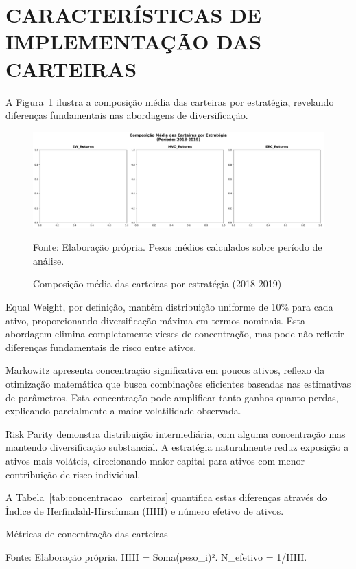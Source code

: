 \section{CARACTERÍSTICAS DE IMPLEMENTAÇÃO DAS CARTEIRAS}

A Figura~\ref{fig:composicao_carteiras} ilustra a composição média das carteiras por estratégia, revelando diferenças fundamentais nas abordagens de diversificação.

\begin{figure}[H]
\centering
\includegraphics[width=\textwidth]{figures/composicao_carteiras_essencial.png}
\caption{Composição média das carteiras por estratégia (2018-2019)}
\label{fig:composicao_carteiras}
\footnotesize
Fonte: Elaboração própria. Pesos médios calculados sobre período de análise.
\end{figure}

Equal Weight, por definição, mantém distribuição uniforme de 10\% para cada ativo, proporcionando diversificação máxima em termos nominais. Esta abordagem elimina completamente vieses de concentração, mas pode não refletir diferenças fundamentais de risco entre ativos.

Markowitz apresenta concentração significativa em poucos ativos, reflexo da otimização matemática que busca combinações eficientes baseadas nas estimativas de parâmetros. Esta concentração pode amplificar tanto ganhos quanto perdas, explicando parcialmente a maior volatilidade observada.

Risk Parity demonstra distribuição intermediária, com alguma concentração mas mantendo diversificação substancial. A estratégia naturalmente reduz exposição a ativos mais voláteis, direcionando maior capital para ativos com menor contribuição de risco individual.

A Tabela~\ref{tab:concentracao_carteiras} quantifica estas diferenças através do Índice de Herfindahl-Hirschman (HHI) e número efetivo de ativos.

\begin{table}[H]
\centering
\caption{Métricas de concentração das carteiras}
\label{tab:concentracao_carteiras}

\footnotesize
Fonte: Elaboração própria. HHI = Soma(peso\_i)². N\_efetivo = 1/HHI.
\end{table}

